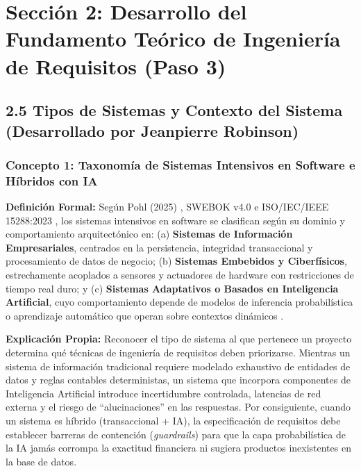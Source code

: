 
\section{Sección 2: Desarrollo del Fundamento Teórico de Ingeniería de Requisitos (Paso 3)}

\subsection{2.5 Tipos de Sistemas y Contexto del Sistema (Desarrollado por Jeanpierre Robinson)}

\subsubsection{Concepto 1: Taxonomía de Sistemas Intensivos en Software e Híbridos con IA}
\textbf{Definición Formal:} Según Pohl (2025) \cite{pohl2025}, SWEBOK v4.0 \cite{swebok2024} e ISO/IEC/IEEE 15288:2023 \cite{ieee15288}, los sistemas intensivos en software se clasifican según su dominio y comportamiento arquitectónico en: (a) \textbf{Sistemas de Información Empresariales}, centrados en la persistencia, integridad transaccional y procesamiento de datos de negocio; (b) \textbf{Sistemas Embebidos y Ciberfísicos}, estrechamente acoplados a sensores y actuadores de hardware con restricciones de tiempo real duro; y (c) \textbf{Sistemas Adaptativos o Basados en Inteligencia Artificial}, cuyo comportamiento depende de modelos de inferencia probabilística o aprendizaje automático que operan sobre contextos dinámicos \cite{pohl2025, swebok2024}.

\textbf{Explicación Propia:} Reconocer el tipo de sistema al que pertenece un proyecto determina qué técnicas de ingeniería de requisitos deben priorizarse. Mientras un sistema de información tradicional requiere modelado exhaustivo de entidades de datos y reglas contables deterministas, un sistema que incorpora componentes de Inteligencia Artificial introduce incertidumbre controlada, latencias de red externa y el riesgo de ``alucinaciones'' en las respuestas. Por consiguiente, cuando un sistema es híbrido (transaccional + IA), la especificación de requisitos debe establecer barreras de contención (\textit{guardrails}) para que la capa probabilística de la IA jamás corrompa la exactitud financiera ni sugiera productos inexistentes en la base de datos.

